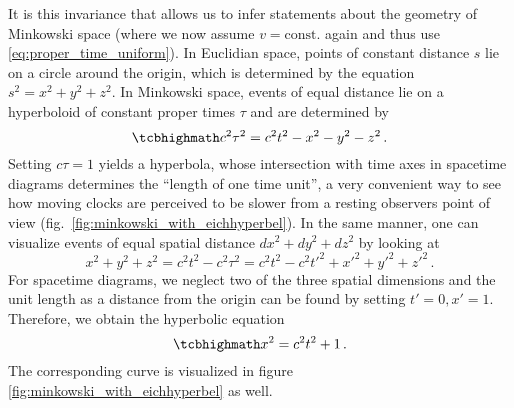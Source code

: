It is this invariance that allows us to infer statements about the geometry of Minkowski space (where we now assume $v = \text{const.}$ again and thus use \eqref{eq:proper_time_uniform}). In Euclidian space, points of constant distance $s$ lie on a circle around the origin, which is determined by the equation $s^2 = x^2 + y^2 + z^2$. In Minkowski space, events of equal distance lie on a hyperboloid of constant proper times $\tau$ and are determined by
\begin{equation}\label{eq:eichhyperbel}
	\eqbox{
	c^2 \tau^2 = c^2 t^2 - x^2 - y^2 - z^2
	} \, .
\end{equation}
Setting $c \tau = 1$ yields a hyperbola, whose intersection with time axes in spacetime diagrams determines the \enquote{length of one time unit}, a very convenient way to see how moving clocks are perceived to be slower from a resting observers point of view (fig.~\ref{fig:minkowski_with_eichhyperbel}). In the same manner, one can visualize events of equal spatial distance $dx^2 + dy^2 + dz^2$ by looking at
\begin{equation*}
	x^2 + y^2 + z^2 = c^2 t^2 - c^2 \tau^2 = c^2 t^2 - c^2 t'^2 + x'^2 + y'^2 + z'^2
	\, .
\end{equation*}
For spacetime diagrams, we neglect two of the three spatial dimensions and the unit length as a distance from the origin can be found by setting $t' = 0, x' = 1$. Therefore, we obtain the hyperbolic equation
\begin{equation}
	\eqbox{
	x^2 = c^2 t^2 + 1
	} \, .
\end{equation}
The corresponding curve is visualized in figure \ref{fig:minkowski_with_eichhyperbel} as well.\\



